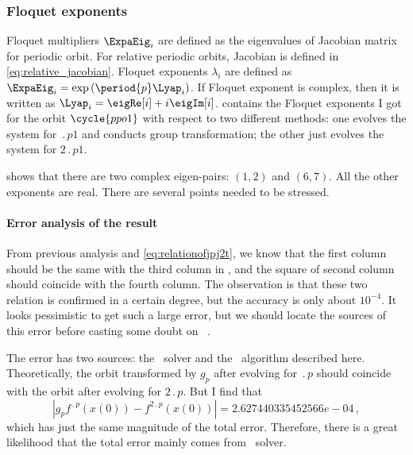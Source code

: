 	\subsubsection{Floquet exponents}
		Floquet multipliers $\ExpaEig_{i}$ are defined as the eigenvalues of Jacobian matrix for periodic
		orbit. For relative periodic orbits, Jacobian is defined in \eqref{eq:relative_jacobian}.
		Floquet exponents $\lambda_{i}$ are defined as
        $\ExpaEig_{i}=\exp\left(\period{p}\Lyap_{i}\right)$. If Floquet exponent
        is complex, then it is written as
        $\Lyap_{i}=\eigRe[i]+i\eigIm[i]$.
		 contains the Floquet exponents I got for the orbit $\cycle{ppo1}$ with
		respect to two different methods: one evolves the system for $\period{p1}$ and conducts group transformation;
		the other just evolves the system for $2\period{p1}$.
		

		
 shows that there are two complex eigen-pairs:
$(1,2)$ and $(6,7)$. All the other exponents are real. There are several
points needed to be stressed.

		\paragraph{Error analysis of the result}
		From previous analysis and \eqref{eq:relationofjpj2t}, we know that the first column should be the same
		with the third column in , and the square of second column should
		coincide with the fourth column. The observation is that these two relation is confirmed in a certain
		degree, but the accuracy is only about $10^{-4}$. It looks pessimistic
		to get such a large error, but we should locate the sources of this error before casting some doubt on
		\psd\ .
		
		The error has two sources:
		the \KSe\ solver and the \psd\ algorithm described here.
		Theoretically, the orbit transformed by $g_{p}$ after evolving for $\period{p}$ should coincide with the orbit
		after evolving for $2\period{p}$. But I find that
		\[
		|g_{p}f^{\period{p}}(x(0))- f^{2\period{p}}(x(0))|=2.627440335452566e-04		
        \,,
        \]
which has just the same magnitude of the total error. Therefore, there is
a great likelihood that the total error mainly comes from \KSe\ solver.

